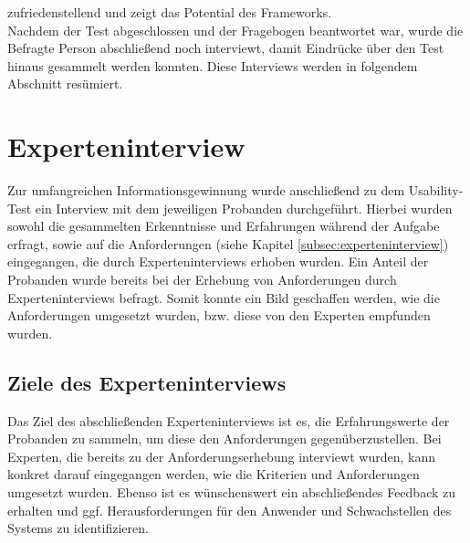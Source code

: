         zufriedenstellend und zeigt das Potential des Frameworks. 
        \\
        Nachdem der Test abgeschlossen und der Fragebogen beantwortet war, wurde die Befragte Person abschließend noch interviewt, damit 
        Eindrücke über den Test hinaus gesammelt werden konnten. Diese Interviews werden in folgendem Abschnitt resümiert. 

\section{Experteninterview}
        Zur umfangreichen Informationsgewinnung wurde anschließend zu dem Usability-Test ein Interview mit dem jeweiligen Probanden 
        durchgeführt. Hierbei wurden sowohl die gesammelten Erkenntnisse und Erfahrungen während der Aufgabe erfragt, sowie auf die Anforderungen 
        (siehe Kapitel \ref{subsec:experteninterview}) eingegangen, die durch Experteninterviews erhoben wurden. Ein Anteil der Probanden wurde bereits 
        bei der Erhebung von Anforderungen durch Experteninterviews befragt. Somit konnte ein Bild geschaffen werden, wie die Anforderungen 
        umgesetzt wurden, bzw. diese von den Experten empfunden wurden.
    
    \subsection{Ziele des Experteninterviews}
        Das Ziel des abschließenden Experteninterviews ist es, die Erfahrungswerte der Probanden zu sammeln, um diese den Anforderungen gegenüberzustellen. Bei 
        Experten, die bereits zu der Anforderungserhebung interviewt wurden, kann konkret darauf eingegangen werden, wie die Kriterien und Anforderungen 
        umgesetzt wurden. Ebenso ist es wünschenswert ein abschließendes Feedback zu erhalten und ggf. Herausforderungen für den Anwender und Schwachstellen 
        des Systems zu identifizieren. 

